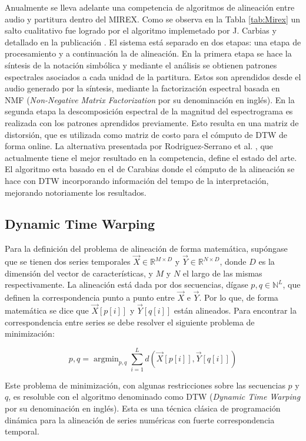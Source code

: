 \documentclass
  [ams,pdfout]%
	{aeslac}
\DeclareMathOperator*{\argmin}{argmin}
\begin{document}
Anualmente se lleva adelante una competencia de algoritmos de alineación entre audio y partitura dentro del MIREX. Como se observa en la Tabla \ref{tab:Mirex} un salto cualitativo fue logrado por el algoritmo implemetado por J. Carbias y detallado en la publicación \cite{carabias2015audio}. El sistema está separado en dos etapas: una etapa de procesamiento y a continuación la de alineación. En la primera etapa se hace la síntesis de la notación simbólica y mediante el análisis se obtienen patrones espectrales asociados a cada unidad de la partitura. Estos son aprendidos desde el audio generado por la síntesis, mediante la factorización espectral basada en NMF (\textit{Non-Negative Matrix Factorization} por su denominación en inglés). En la segunda etapa la descomposición espectral de la magnitud del espectrograma es realizada con los patrones aprendidos previamente. Esto resulta en una matriz de distorsión, que es utilizada como matriz de costo para el cómputo de DTW de forma online. La alternativa presentada por Rodriguez-Serrano et al. \cite{rodriguez2017tempo}, que actualmente tiene el mejor resultado en la competencia, define el estado del arte. El algoritmo esta basado en el de Carabias donde el cómputo de la alineación se hace con DTW incorporando información del tempo de la interpretación, mejorando notoriamente los resultados.

\subsection{Dynamic Time Warping}

Para la definición del problema de alineación de forma matemática, supóngase que se tienen dos series temporales $\vec{X}\in\mathbb{R}^{M\times D}$ y $\vec{Y}\in\mathbb{R}^{N\times D}$, donde $D$ es la dimensión del vector de características, y $M$ y $N$ el largo de las mismas respectivamente. La alineación está dada por dos secuencias, dígase $p, q \in \mathbb{N}^{L}$, que definen la correspondencia punto a punto entre $\vec{X}$ e $\vec{Y}$. Por lo que, de forma matemática se dice que $\vec{X}[p[i]]$ y $\vec{Y}[q[i]]$ están alineados. Para encontrar la correspondencia entre series se debe resolver el siguiente problema de minimización:

\begin{equation}
p,q = \argmin_{p,q} \sum_{i=1}^{L} d(\vec{X}[p[i]],\vec{Y}[q[i]]) 
\end{equation}

Este problema de minimización, con algunas restricciones sobre las secuencias $p$ y $q$, es resoluble con el algoritmo denominado como DTW (\textit{Dynamic Time Warping} por su denominación en inglés). Esta es una técnica clásica de programación dinámica para la alineación de series numéricas con fuerte correspondencia temporal. 
\end{document}
